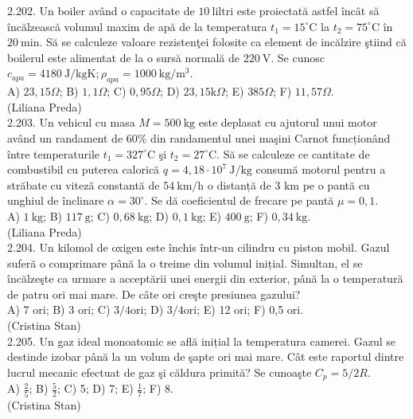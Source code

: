 2.202. Un boiler având o capacitate de $10 \mathrm{~liltri}$ este proiectată astfel încât să încălzească volumul maxim de apă de la temperatura $t_{1}=15^{\circ} \mathrm{C}$ la $t_{2}=75^{\circ} \mathrm{C}$ în $20 \mathrm{~min}$. Să se calculeze valoare rezistenţei folosite ca element de incălzire ştiind că boilerul este alimentat de la o sursă normală de $220 \mathrm{~V}$. Se cunosc $c_{a p a}=4180 \mathrm{~J} / \mathrm{kgK} ; \rho_{a p a}=1000 \mathrm{~kg} / \mathrm{m}^{3}$.\\ A) $23,15 \Omega$; B) $1,1 \Omega$; C) $0,95 \Omega$; D) $23,15 \mathrm{k} \Omega$; E) $385 \Omega$; F) $11,57 \Omega$.\\ (Liliana Preda)\\

2.203. Un vehicul cu masa $M=500 \mathrm{~kg}$ este deplasat cu ajutorul unui motor având un randament de $60 \%$ din randamentul unei maşini Carnot funcționând între temperaturile $t_{1}=327^{\circ} \mathrm{C}$ şi $t_{2}=27^{\circ} \mathrm{C}$. Să se calculeze ce cantitate de combustibil cu puterea calorică $q=4,18 \cdot 10^{7} \mathrm{~J} / \mathrm{kg}$ consumă motorul pentru a străbate cu viteză constantă de $54 \mathrm{~km} / \mathrm{h}$ o distanță de 3 km pe o pantă cu unghiul de înclinare $\alpha=30^{\circ}$. Se dă coeficientul de frecare pe pantă $\mu=0,1$.\\ A) $1 \mathrm{~kg}$; B) $117 \mathrm{~g}$; C) $0,68 \mathrm{~kg}$; D) $0,1 \mathrm{~kg}$; E) $400 \mathrm{~g}$; F) $0,34 \mathrm{~kg}$.\\ (Liliana Preda)\\

2.204. Un kilomol de oxigen este închis într-un cilindru cu piston mobil. Gazul suferă o comprimare până la o treime din volumul inițial. Simultan, el se încălzeşte ca urmare a acceptării unei energii din exterior, până la o temperatură de patru ori mai mare. De câte ori creşte presiunea gazului?\\ A) 7 ori; B) 3 ori; C) $3 / 4 \mathrm{ori}$; D) $3 / 4 \mathrm{ori}$; E) 12 ori; F) 0,5 ori.\\ (Cristina Stan)\\

2.205. Un gaz ideal monoatomic se află inițial la temperatura camerei. Gazul se destinde izobar până la un volum de şapte ori mai mare. Cât este raportul dintre lucrul mecanic efectuat de gaz şi căldura primită? Se cunoaşte $C_{p}=5 / 2 R$.\\ A) $\frac{2}{5}$; B) $\frac{5}{2}$; C) 5; D) 7; E) $\frac{1}{7}$; F) 8.\\ (Cristina Stan)\\

